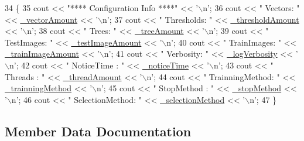 \begin{DoxyCode}
34                           \{
35     cout << \textcolor{stringliteral}{"**** Configuration Info ****"}              << \textcolor{charliteral}{'\(\backslash\)n'};
36     cout << \textcolor{stringliteral}{"   Vectors: "}         << \hyperlink{classConfigData_af590033be1d5469272aa1010353232d5}{\_vectorAmount}     << \textcolor{charliteral}{'\(\backslash\)n'};
37     cout << \textcolor{stringliteral}{"   Thresholds: "}      << \hyperlink{classConfigData_a1956520556b7b407196a5b4153f6b083}{\_thresholdAmount}  << \textcolor{charliteral}{'\(\backslash\)n'};
38     cout << \textcolor{stringliteral}{"   Trees: "}           << \hyperlink{classConfigData_a4a8f85fa6d12865575b2226939964a09}{\_treeAmount}       << \textcolor{charliteral}{'\(\backslash\)n'};
39     cout << \textcolor{stringliteral}{"   TestImages: "}      << \hyperlink{classConfigData_a40355707f3b365a9b83b7530e0de1316}{\_testImageAmount}  << \textcolor{charliteral}{'\(\backslash\)n'};
40     cout << \textcolor{stringliteral}{"   TrainImages: "}     << \hyperlink{classConfigData_aa9ece3a15e191b330db21d48b4f092e2}{\_trainImageAmount} << \textcolor{charliteral}{'\(\backslash\)n'};
41     cout << \textcolor{stringliteral}{"   Verbosity: "}       << \hyperlink{classConfigData_aa8483944273e9eaa13dff184a8079633}{\_logVerbosity}     << \textcolor{charliteral}{'\(\backslash\)n'};
42     cout << \textcolor{stringliteral}{"   NoticeTime : "}     << \hyperlink{classConfigData_a1b82ac5b308abfd0e5a8e4eccec72076}{\_noticeTime}       << \textcolor{charliteral}{'\(\backslash\)n'};
43     cout << \textcolor{stringliteral}{"   Threads : "}        << \hyperlink{classConfigData_a349c395a667ed45ff0fc4bd0753e890b}{\_threadAmount}     << \textcolor{charliteral}{'\(\backslash\)n'};
44     cout << \textcolor{stringliteral}{"   TrainningMethod: "} << \hyperlink{classConfigData_a161bf96e6b8d33d2bf10b86f82546b36}{\_trainningMethod}  << \textcolor{charliteral}{'\(\backslash\)n'};
45     cout << \textcolor{stringliteral}{"   StopMethod : "}     << \hyperlink{classConfigData_a0f6db7bbe04644529713729e929b67c0}{\_stopMethod}       << \textcolor{charliteral}{'\(\backslash\)n'};
46     cout << \textcolor{stringliteral}{"   SelectionMethod: "} << \hyperlink{classConfigData_a348ab0349d09526606e839a639881172}{\_selectionMethod}  << \textcolor{charliteral}{'\(\backslash\)n'};
47 \}
\end{DoxyCode}


\subsection{Member Data Documentation}
